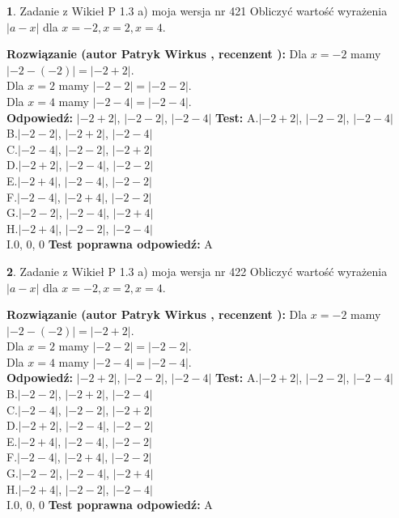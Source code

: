 \documentclass[12pt, a4paper]{article}
\theoremstyle{definition} %
\newtheorem{zad}{}
\newcommand{\zadStart}[1]{\begin{zad}#1\newline}
\newcommand{\zadStop}{\end{zad}}
\newcommand{\rozwStart}[2]{\noindent \textbf{Rozwiązanie (autor #1 , recenzent #2): }\newline}
\newcommand{\rozwStop}{\newline}
\newcommand{\odpStart}{\noindent \textbf{Odpowiedź:}\newline}
\newcommand{\odpStop}{\newline}
\newcommand{\testStart}{\noindent \textbf{Test:}\newline}
\newcommand{\testStop}{\newline}
\newcommand{\kluczStart}{\noindent \textbf{Test poprawna odpowiedź:}\newline}
\newcommand{\kluczStop}{\newline}
\begin{document}
\zadStart{Zadanie z Wikieł P 1.3 a) moja wersja nr 421}
Obliczyć wartość wyrażenia $|a - x|$ dla $x=-2,x=2,x=4$.
\zadStop
\rozwStart{Patryk Wirkus}{}
Dla $x = -2$ mamy $|-2 - (-2)| = |-2 + 2|$.\\
Dla $x = 2$ mamy $|-2 - 2| = |-2 - 2|$.\\
Dla $x = 4$ mamy $|-2 - 4| = |-2 - 4|$.\\
\rozwStop
\odpStart
$|-2 + 2|$, $|-2 - 2|$, $|-2 - 4|$
\odpStop
\testStart
A.$|-2 + 2|$, $|-2 - 2|$, $|-2 - 4|$\\
B.$|-2 - 2|$, $|-2 + 2|$, $|-2 - 4|$\\
C.$|-2 - 4|$, $|-2 - 2|$, $|-2 + 2|$\\
D.$|-2 + 2|$, $|-2 - 4|$, $|-2 - 2|$\\
E.$|-2 + 4|$, $|-2 - 4|$, $|-2 - 2|$\\
F.$|-2 - 4|$, $|-2 + 4|$, $|-2 - 2|$\\
G.$|-2 - 2|$, $|-2 - 4|$, $|-2 + 4|$\\
H.$|-2 + 4|$, $|-2 - 2|$, $|-2 - 4|$\\
I.$0$, $0$, $0$
\testStop
\kluczStart
A
\kluczStop



\zadStart{Zadanie z Wikieł P 1.3 a) moja wersja nr 422}
Obliczyć wartość wyrażenia $|a - x|$ dla $x=-2,x=2,x=4$.
\zadStop
\rozwStart{Patryk Wirkus}{}
Dla $x = -2$ mamy $|-2 - (-2)| = |-2 + 2|$.\\
Dla $x = 2$ mamy $|-2 - 2| = |-2 - 2|$.\\
Dla $x = 4$ mamy $|-2 - 4| = |-2 - 4|$.\\
\rozwStop
\odpStart
$|-2 + 2|$, $|-2 - 2|$, $|-2 - 4|$
\odpStop
\testStart
A.$|-2 + 2|$, $|-2 - 2|$, $|-2 - 4|$\\
B.$|-2 - 2|$, $|-2 + 2|$, $|-2 - 4|$\\
C.$|-2 - 4|$, $|-2 - 2|$, $|-2 + 2|$\\
D.$|-2 + 2|$, $|-2 - 4|$, $|-2 - 2|$\\
E.$|-2 + 4|$, $|-2 - 4|$, $|-2 - 2|$\\
F.$|-2 - 4|$, $|-2 + 4|$, $|-2 - 2|$\\
G.$|-2 - 2|$, $|-2 - 4|$, $|-2 + 4|$\\
H.$|-2 + 4|$, $|-2 - 2|$, $|-2 - 4|$\\
I.$0$, $0$, $0$
\testStop
\kluczStart
A
\kluczStop
\end{document}
